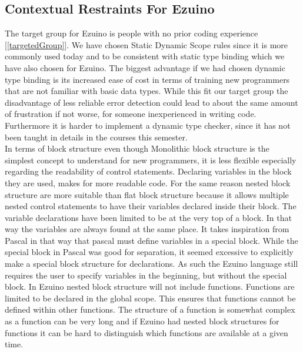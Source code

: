 \subsection*{Contextual Restraints For Ezuino}
The target group for Ezuino is people with no prior coding experience [\ref{targetedGroup}]. We have chosen Static Dynamic Scope rules since it is more commonly used today and to be consistent with static type binding which we have also chosen for Ezuino. The biggest advantage if we had chosen dynamic type binding is its increased ease of cost in terms of training new programmers that are not familiar with basic data types. While this fit our target group the disadvantage of less reliable error detection could lead to about the same amount of frustration if not worse, for someone inexperienced in writing code. Furthermore it is harder to implement a dynamic type checker, since it has not been taught in details in the courses this semester. \\
In terms of block structure even though Monolithic block structure is the simplest concept to understand for new programmers, it is less flexible especially regarding the readability of control statements. Declaring variables in the block they are used, makes for more readable code. For the same reason nested block structure are more suitable than flat block structure because it allows multiple nested control statements to have their variables declared inside their block. 
The variable declarations have been limited to be at the very top of a block. In that way the variables are always found at the same place. It takes inspiration from Pascal in that way that pascal must define variables in a special block. While the special block in Pascal was good for separation, it seemed excessive to explicitly make a special block structure for declarations. As such the Ezuino language still requires the user to specify variables in the beginning, but without the special block.
In Ezuino nested block structure will not include functions. Functions are limited to be declared in the global scope. This ensures that functions cannot be defined within other functions. The structure of a function is somewhat complex as a function can be very long and if Ezuino had nested block structures for functions it can be hard to distinguish which functions are available at a given time.

